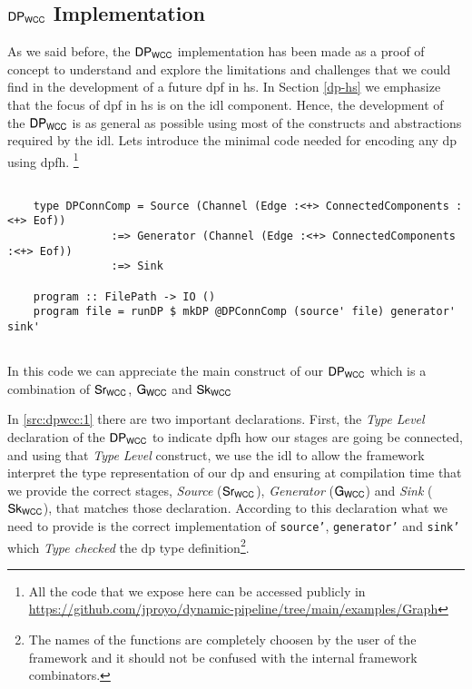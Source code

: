 \subsection{\texorpdfstring{$\mathsf{DP_{WCC}}$}{Lg} Implementation}
%
As we said before, the $\mathsf{DP_{WCC}}$ implementation has been made as a proof of concept to understand and explore the limitations and challenges that we could find in the development of a future \acrshort{dpf} in \acrshort{hs}. 
In Section \ref{dp-hs} we emphasize that the focus of \acrshort{dpf} in \acrshort{hs} is on the \acrshort{idl} component. 
Hence, the development of the $\mathsf{DP_{WCC}}$ is as general as possible using most of the constructs and abstractions required by the \acrshort{idl}. 
Lets introduce the minimal code needed for encoding any \acrshort{dp} using \acrshort{dpfh}. \footnote{All the code that we expose here can be accessed publicly in \url{https://github.com/jproyo/dynamic-pipeline/tree/main/examples/Graph}}

\begin{listing}[H]
  \begin{verbatim}
    
    type DPConnComp = Source (Channel (Edge :<+> ConnectedComponents :<+> Eof))
                :=> Generator (Channel (Edge :<+> ConnectedComponents :<+> Eof))
                :=> Sink

    program :: FilePath -> IO ()
    program file = runDP $ mkDP @DPConnComp (source' file) generator' sink'
        
  \end{verbatim}
  \caption[{[\texttt{ConnectedComp.hs}] Main entry point of the program}]{In this code we can appreciate the main construct of our $\dpwcc$ which is a combination of $\iwc$, $\gwc$ and $\owc$}
  \label{src:dpwcc:1}
\end{listing}

In \autoref{src:dpwcc:1} there are two important declarations. First, the \textit{Type Level} declaration of the $\mathsf{DP_{WCC}}$ to indicate \acrshort{dpfh} how our stages are going be connected, and
using that \textit{Type Level} construct, we use the \acrshort{idl} to allow the framework interpret the type representation of our \acrshort{dp} and ensuring at compilation time that we provide the correct stages,  \textit{Source} ($\mathsf{Sr_{WCC}}$), \textit{Generator} ($\mathsf{G_{WCC}}$) and \textit{Sink} ($\mathsf{Sk_{WCC}}$), that matches those declaration.
According to this declaration what we need to provide is the correct implementation of \texttt{source'}, \texttt{generator'} and \texttt{sink'}
which \textit{Type checked} the \acrshort{dp} type definition\footnote{The names of the functions are completely choosen by the user of the framework and it should not be confused with the internal framework combinators.}.

